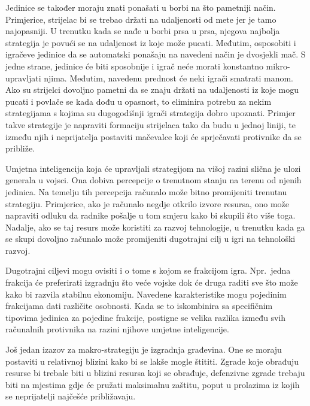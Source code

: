 \documentclass[times, utf8, zavrsni, numeric]{fer}
\begin{document}
\par Jedinice se također moraju znati ponašati u borbi na što pametniji način. Primjerice, strijelac bi se trebao držati na udaljenosti od mete jer je tamo najopasniji.
U trenutku kada se nađe u borbi prsa u prsa, njegova najbolja strategija je povući se na udaljenost iz koje može pucati.
Međutim, osposobiti i igračeve jedinice da se automatski ponašaju na navedeni način  je dvosjekli mač.
S jedne strane, jedinice će biti sposobnije i igrač neće morati konstantno mikro-upravljati njima.
Međutim, navedenu prednost će neki igrači smatrati manom.
Ako su strijelci dovoljno pametni da se znaju držati na udaljenosti iz koje mogu pucati i povlače se kada dođu u opasnost, to eliminira potrebu za nekim strategijama s kojima su dugogodišnji igrači strategija dobro upoznati.
Primjer takve strategije je napraviti formaciju strijelaca tako da budu u jednoj liniji, te između njih i neprijatelja postaviti mačevalce koji će sprječavati protivnike da se približe.

\par Umjetna inteligencija koja će upravljali strategijom na višoj razini slična je ulozi generala u vojsci. 
Ona dobiva percepcije o trenutnom stanju na terenu od njenih jedinica.
Na temelju tih percepcija računalo može bitno promijeniti trenutnu strategiju. Primjerice, ako je računalo negdje otkrilo izvore resursa, ono može napraviti odluku da radnike pošalje u tom smjeru kako bi skupili što više toga.
Nadalje, ako se taj resurs može koristiti za razvoj tehnologije, u trenutku kada ga se skupi dovoljno računalo može promijeniti dugotrajni cilj u igri na tehnološki razvoj.

\par Dugotrajni ciljevi mogu ovisiti i o tome s kojom se frakcijom igra. 
Npr.\ jedna frakcija će preferirati izgradnju što veće vojske dok će druga raditi sve što može kako bi razvila stabilnu ekonomiju.
Navedene karakteristike mogu pojedinim frakcijama dati različite osobnosti.
Kada se to iskombinira sa specifičnim tipovima jedinica za pojedine frakcije, postigne se velika razlika između svih računalnih protivnika na razini njihove umjetne inteligencije.

\par Još jedan izazov za makro-strategiju je izgradnja građevina.
One se moraju postaviti u relativnoj blizini kako bi se lakše mogle štititi.
Zgrade koje obrađuju resurse bi trebale biti u blizini resursa koji se obrađuje, defenzivne zgrade trebaju biti na mjestima gdje će pružati maksimalnu zaštitu, poput u prolazima iz kojih se neprijatelji najčešće približavaju.
\end{document}
